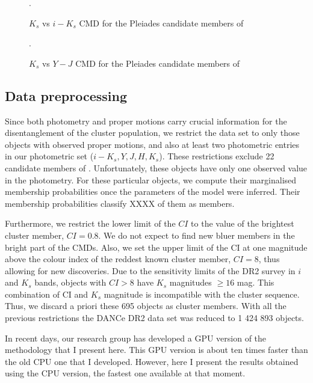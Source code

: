 \begin{figure}[htbp]
\begin{center}
\caption{$K_s$ vs $i-K_s$ CMD for the Pleiades candidate members of \citet{Bouy2015}}.
\label{fig:CI}
\end{center}
\end{figure}

\begin{figure}[htbp]
\begin{center}
\caption{$K_s$ vs $Y-J$ CMD for the Pleiades candidate members of \citet{Bouy2015}}.
\label{fig:otherCI}
\end{center}
\end{figure}

\subsection{Data preprocessing}
Since both photometry and proper motions carry crucial information for the disentanglement of the cluster population, we restrict the data set to only those objects with observed proper motions, and also at least two photometric entries in our photometric set ($i-K_s,Y,J,H,K_s$). These restrictions exclude 22 candidate members of \citet{Bouy2015}. Unfortunately, these objects have only one observed value in the photometry. For these particular objects, we compute their marginalised membership probabilities once the parameters of the model were inferred. Their membership probabilities classify XXXX of them as members. 

 Furthermore, we restrict the lower limit of the $CI$ to the value of the brightest cluster member, $CI =0.8$. We do not expect to find new bluer members in the bright part of the CMDs. Also, we set the upper limit of the CI at one magnitude above the colour index of the reddest known cluster member, $CI=8$, thus allowing for new discoveries. Due to the sensitivity limits of the DR2 survey in $i$ and $K_s$ bands, objects with $CI>8$ have $K_s$ magnitudes $\geq 16$ mag. This combination of CI and $K_s$ magnitude is incompatible with the cluster sequence. Thus, we discard a priori these 695 objects as cluster members. With all the previous restrictions the DANCe DR2 data set was reduced to 1 424 893 objects.

In recent days, our research group has developed a GPU version of the methodology that I present here. This GPU version is about ten times faster than the old CPU one that I developed. However, here I present the results obtained using the CPU version, the fastest one available at that moment.

